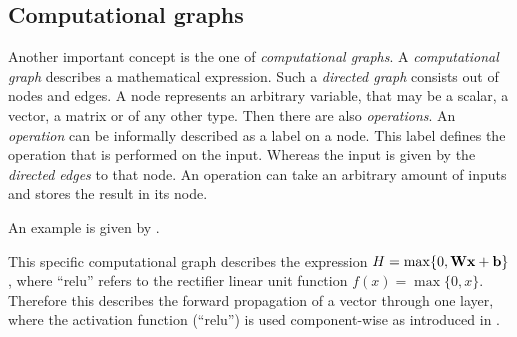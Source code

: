 \subsection{Computational graphs}
\label{sec:computational-graphs}

Another important concept is the one of \emph{computational graphs}.
A \emph{computational graph} describes a mathematical expression.
Such a \emph{directed graph} consists out of nodes and edges.
A node represents an arbitrary variable, that may be a scalar, a vector, a matrix or of any other type.
Then there are also \emph{operations}.
An \emph{operation} can be informally described as a label on a node.
This label defines the operation that is performed on the input.
Whereas the input is given by the \emph{directed edges} to that node.
An operation can take an arbitrary amount of inputs and stores the result in its node.

An example is given by .


This specific computational graph describes the expression \(H = \max\{0, \textbf{W}\textbf{x} + \textbf{b}\}\), 
where \enquote{relu} refers to the rectifier linear unit function \(f(x) = \max\{0, x\}\).
Therefore this describes the forward propagation of a vector  through one layer, where the activation function (\enquote{relu}) is used component-wise as introduced in .